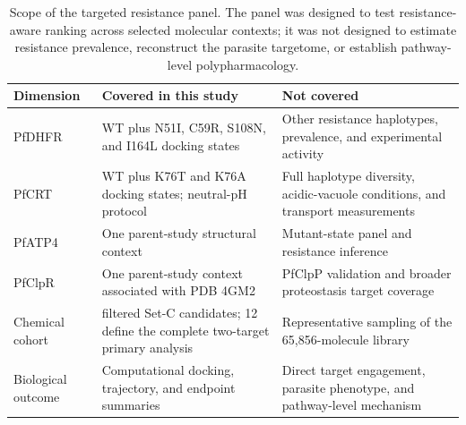 \begin{table}[htbp]
\centering
\scriptsize
\caption{Scope of the targeted resistance panel. The panel was designed to test resistance-aware ranking across selected molecular contexts; it was not designed to estimate resistance prevalence, reconstruct the parasite targetome, or establish pathway-level polypharmacology.}
\label{tab:s14_panel_scope}
\begin{tabularx}{\textwidth}{>{\raggedright\arraybackslash}p{} >{\raggedright\arraybackslash}p{} >{\raggedright\arraybackslash}X}
\toprule
Dimension & Covered in this study & Not covered \\
\midrule
PfDHFR & WT plus N51I, C59R, S108N, and I164L docking states & Other resistance haplotypes, prevalence, and experimental activity \\
PfCRT & WT plus K76T and K76A docking states; neutral-pH protocol & Full haplotype diversity, acidic-vacuole conditions, and transport measurements \\
PfATP4 & One parent-study structural context & Mutant-state panel and resistance inference \\
PfClpR & One parent-study context associated with PDB 4GM2 & PfClpP validation and broader proteostasis target coverage \\
Chemical cohort & 17 filtered Set-C candidates; 12 define the complete two-target primary analysis & Representative sampling of the 65,856-molecule library \\
Biological outcome & Computational docking, trajectory, and endpoint summaries & Direct target engagement, parasite phenotype, and pathway-level mechanism \\
\bottomrule
\end{tabularx}
\end{table}
